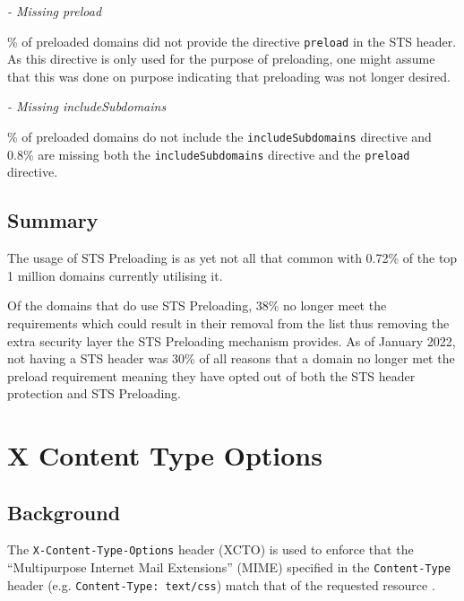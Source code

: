 \documentclass{mscreport}
\begin{document}
\vspace{0.3cm} \noindent
\textit{- Missing preload}

\vspace{0.3cm} \% of preloaded domains did not provide the directive \texttt{preload} in the STS header. As this directive is only used for the purpose of preloading, one might assume that this was done on purpose indicating that preloading was not longer desired.

\vspace{0.3cm} \noindent
\textit{- Missing includeSubdomains}

\vspace{0.3cm} \% of preloaded domains do not include the \texttt{includeSubdomains} directive and 0.8\% are missing both the \texttt{includeSubdomains} directive and the \texttt{preload} directive.

\subsection{Summary}

\noindent
The usage of STS Preloading is as yet not all that common with 0.72\% of the top 1 million domains currently utilising it.

\vspace{0.3cm} \noindent
Of the domains that do use STS Preloading, 38\% no longer meet the requirements which could result in their removal from the list thus removing the extra security layer the STS Preloading mechanism provides. As of January 2022, not having a STS header was 30\% of all reasons that a domain no longer met the preload requirement meaning they have opted out of both the STS header protection and STS Preloading.



\section{X Content Type Options}
\label{section:xcto}

\subsection{Background}

The \texttt{X-Content-Type-Options} header (XCTO) is used to enforce that the ``Multipurpose Internet Mail Extensions'' (MIME) specified in the \texttt{Content-Type} header (e.g. \newline 
\texttt{Content-Type: text/css}) match that of the requested resource \cite{Apple_undated-hz}.
\end{document}
